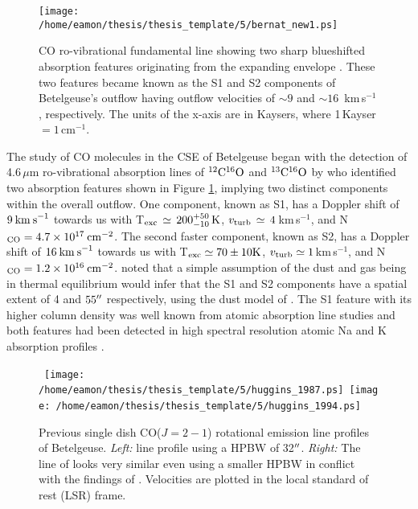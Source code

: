 \begin{figure}[!t]
\centering 
          \texttt{[image: /home/eamon/thesis/thesis\_template/5/bernat\_new1.ps]}
\caption[Bernat (1979) CO line profile showing two sharp line cores]{CO ro-vibrational fundamental line showing two sharp blueshifted absorption features originating from the expanding envelope \citep{bernat_1979}. These two features became known as the S1 and S2 components of Betelgeuse's outflow having outflow velocities of $\sim 9$ and $\sim 16$\, km\,s$^{-1}$, respectively. The units of the x-axis are in Kaysers, where 1\,Kayser\,$ = 1$\,cm$^{-1}$.}
\label{fig:5.1}
\end{figure}

The study of CO molecules in the CSE of Betelgeuse began with the detection of 4.6\,$\mu$m ro-vibrational absorption lines of $\rm{{}^{12}C^{16}O}$ and $\rm{{}^{13}C^{16}O}$ by \cite{bernat_1979} who identified two absorption features shown in Figure \ref{fig:5.1}, implying two distinct components within the overall outflow. One component, known as S1, has a Doppler shift of $9\>{\rm km\>s}^{-1}$ towards us with T$_{\rm{exc}}\,\simeq\,200^{+50}_{-10}\,\rm{K}$, $v_{\rm{turb}}\,\simeq\,4$\,km\,s${}^{-1}$, and N$_{\rm{CO}}=4.7\times 10^{17}\>{\rm cm}^{-2}$. The second faster component, known as S2, has a Doppler shift of $16\>{\rm km\>s}^{-1}$ towards us with T$_{\rm{exc}} \simeq 70 \pm 10 \rm{K}$, $v_{\rm{turb}}\simeq 1$\,km\,s${}^{-1}$, and N$_{\rm{CO}}=1.2\times 10^{16}\>{\rm cm}^{-2}$. \cite{bernat_1979} noted that a simple assumption of the dust and gas being in thermal equilibrium would infer that the S1 and S2 components have a spatial extent of 4 and $55^{\prime\prime}$ respectively, using the dust model of \cite{tsuji_1979}. The S1 feature with its higher column density was well known from atomic absorption line studies \citep[e.g.][]{weymann_1962} and both features had been detected in high spectral resolution atomic Na and K absorption profiles \citep{goldberg_1975}.

\begin{figure}[!ht]
\centering 
\mbox{
          \texttt{[image: /home/eamon/thesis/thesis\_template/5/huggins\_1987.ps]}
          \texttt{[image: /home/eamon/thesis/thesis\_template/5/huggins\_1994.ps]}
          }
\caption[Previous CO($J= 2-1$) rotational emission line profiles]{Previous single dish CO($J= 2-1$) rotational emission line profiles of Betelgeuse. \textit{Left:} \cite{huggins_1987} line profile using a HPBW of 32$^{\prime\prime}$. \textit{Right:} The line of \cite{huggins_1994} looks very similar even using a smaller HPBW in conflict with the findings of \cite{huggins_1987}. Velocities are plotted in the local standard of rest (LSR) frame.}
\label{fig:5.2}
\end{figure}


